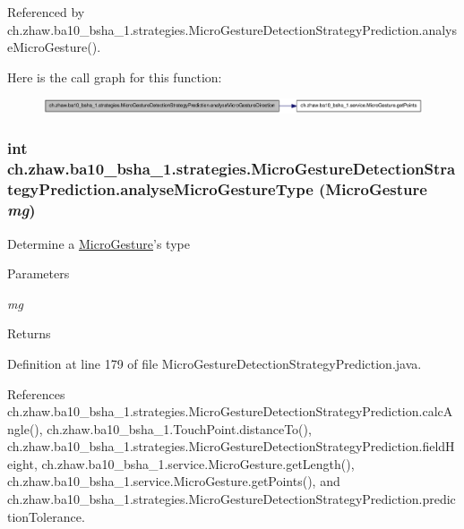 Referenced by ch.zhaw.ba10\_\-bsha\_\-1.strategies.MicroGestureDetectionStrategyPrediction.analyseMicroGesture().

Here is the call graph for this function:\nopagebreak
\begin{figure}[H]
\begin{center}
\leavevmode
\includegraphics[width=404pt]{classch_1_1zhaw_1_1ba10__bsha__1_1_1strategies_1_1MicroGestureDetectionStrategyPrediction_aa2db648dc936c5f878575a23b7915347_cgraph}
\end{center}
\end{figure}
\hypertarget{classch_1_1zhaw_1_1ba10__bsha__1_1_1strategies_1_1MicroGestureDetectionStrategyPrediction_a7a6bce4151aab292c0e6895257364601}{
\subsubsection[{analyseMicroGestureType}]{\setlength{\rightskip}{0pt plus 5cm}int ch.zhaw.ba10\_\-bsha\_\-1.strategies.MicroGestureDetectionStrategyPrediction.analyseMicroGestureType ({\bf MicroGesture} {\em mg})}}
\label{classch_1_1zhaw_1_1ba10__bsha__1_1_1strategies_1_1MicroGestureDetectionStrategyPrediction_a7a6bce4151aab292c0e6895257364601}
Determine a \hyperlink{}{MicroGesture}'s type


\begin{DoxyParams}{Parameters}
\item[{\em mg}]\end{DoxyParams}
\begin{DoxyReturn}{Returns}

\end{DoxyReturn}


Definition at line 179 of file MicroGestureDetectionStrategyPrediction.java.

References ch.zhaw.ba10\_\-bsha\_\-1.strategies.MicroGestureDetectionStrategyPrediction.calcAngle(), ch.zhaw.ba10\_\-bsha\_\-1.TouchPoint.distanceTo(), ch.zhaw.ba10\_\-bsha\_\-1.strategies.MicroGestureDetectionStrategyPrediction.fieldHeight, ch.zhaw.ba10\_\-bsha\_\-1.service.MicroGesture.getLength(), ch.zhaw.ba10\_\-bsha\_\-1.service.MicroGesture.getPoints(), and ch.zhaw.ba10\_\-bsha\_\-1.strategies.MicroGestureDetectionStrategyPrediction.predictionTolerance.

